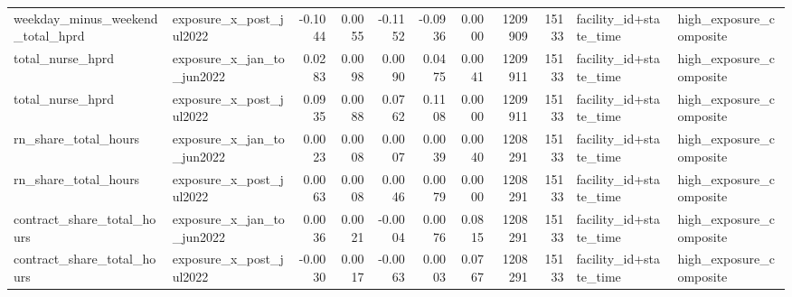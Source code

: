 \begin{tabular}{llrrrrrrrll}
weekday_minus_weekend_total_hprd & exposure_x_post_jul2022 & -0.1044 & 0.0055 & -0.1152 & -0.0936 & 0.0000 & 1209909 & 15133 & facility_id+state_time & high_exposure_composite \\
total_nurse_hprd & exposure_x_jan_to_jun2022 & 0.0283 & 0.0098 & 0.0090 & 0.0475 & 0.0041 & 1209911 & 15133 & facility_id+state_time & high_exposure_composite \\
total_nurse_hprd & exposure_x_post_jul2022 & 0.0935 & 0.0088 & 0.0762 & 0.1108 & 0.0000 & 1209911 & 15133 & facility_id+state_time & high_exposure_composite \\
rn_share_total_hours & exposure_x_jan_to_jun2022 & 0.0023 & 0.0008 & 0.0007 & 0.0039 & 0.0040 & 1208291 & 15133 & facility_id+state_time & high_exposure_composite \\
rn_share_total_hours & exposure_x_post_jul2022 & 0.0063 & 0.0008 & 0.0046 & 0.0079 & 0.0000 & 1208291 & 15133 & facility_id+state_time & high_exposure_composite \\
contract_share_total_hours & exposure_x_jan_to_jun2022 & 0.0036 & 0.0021 & -0.0004 & 0.0076 & 0.0815 & 1208291 & 15133 & facility_id+state_time & high_exposure_composite \\
contract_share_total_hours & exposure_x_post_jul2022 & -0.0030 & 0.0017 & -0.0063 & 0.0003 & 0.0767 & 1208291 & 15133 & facility_id+state_time & high_exposure_composite \\
\bottomrule
\end{tabular}
